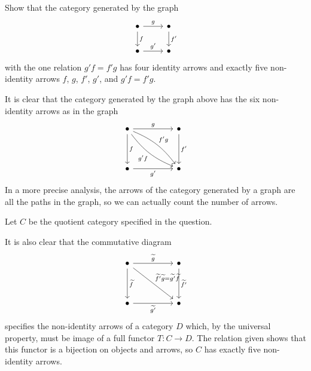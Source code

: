 \begin{exercise}
Show that the category generated by the graph
\vspace{-5pt}\[\begin{tikzcd}
\bullet\arrow[r,"g"]\arrow[d,"f"]&\bullet\arrow[d,"f'"]\\
\bullet\arrow[r,"g'"]&\bullet
\end{tikzcd}\vspace{-5pt}\]
with the one relation $g'f=f'g$ has four identity arrows and exactly five non-identity arrows $f$, $g$, $f'$, $g'$, and $g'f=f'g$.
\end{exercise}
\begin{solution}
It is clear that the category generated by the graph above has the six non-identity arrows as in the graph
\vspace{-5pt}\[\begin{tikzcd}[column sep=huge,row sep=huge]
\bullet\arrow[r,"g"]\arrow[d,"f"]\arrow[rd,bend left=15,"f'g"]\arrow[rd,"g'f",bend right=15,swap]&\bullet\arrow[d,"f'"]\\
\bullet\arrow[r,"g'",swap]&\bullet
\end{tikzcd}\vspace{-5pt}\]
In a more precise analysis, the arrows of the category generated by a graph are all the paths in the graph, so we can actually count the number of arrows.

Let $C$ be the quotient category specified in the question.

It is also clear that the commutative diagram
\vspace{-5pt}\[\begin{tikzcd}[column sep=huge,row sep=huge]
\bullet\arrow[r,"\widetilde{g}"]\arrow[d,"\widetilde{f}"]\arrow[rd,"\widetilde{f'}\widetilde{g}=\widetilde{g'}\widetilde{f}"]&\bullet\arrow[d,"\widetilde{f'}"]\\
\bullet\arrow[r,"\widetilde{g'}",swap]&\bullet
\end{tikzcd}\vspace{-5pt}\]
specifies the non-identity arrows of a category $D$ which, by the universal property, must be image of a full functor $T:C\to D$. The relation given shows that this functor is a bijection on objects and arrows, so $C$ has exactly five non-identity arrows.
\end{solution}

